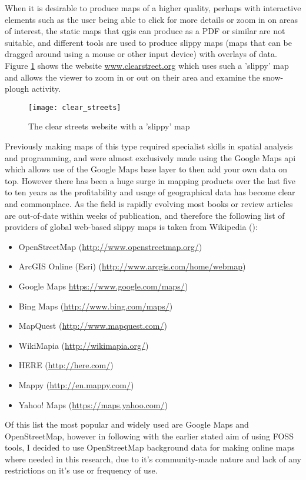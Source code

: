 When it is desirable to produce maps of a higher quality, perhaps with interactive elements such as the user being able to click for more details or zoom in on areas of interest, the static maps that \gls{qgis} can produce as a PDF or similar are not suitable, and different tools are used to produce slippy maps (maps that can be dragged around using a mouse or other input device) with overlays of data. Figure \ref{fig:clear_streets} shows the website \url{www.clearstreet.org} which uses such a 'slippy' map and allows the viewer to zoom in or out on their area and examine the snow-plough activity.

\begin{figure}[H]
\centering
\texttt{[image: clear\_streets]}
\caption{The clear streets website with a 'slippy' map}
\label{fig:clear_streets}
\end{figure}

Previously making maps of this type required specialist skills in spatial analysis and programming, and were almost exclusively made using the Google Maps \gls{api} which allows use of the Google Maps base layer to then add your own data on top. However there has been a huge surge in mapping products over the last five to ten years as the profitability and usage of geographical data has become clear and commonplace. As the field is rapidly evolving most books or review articles are out-of-date within weeks of publication, and therefore the following list of providers of global web-based slippy maps is taken from Wikipedia (\cite{wiki-maps-2014}):

\begin{itemize}
\item OpenStreetMap  (\url{http://www.openstreetmap.org/})
\item ArcGIS Online (Esri)  (\url{http://www.arcgis.com/home/webmap})
\item Google Maps \url{https://www.google.com/maps/})
\item Bing Maps (\url{http://www.bing.com/maps/})
\item MapQuest (\url{http://www.mapquest.com/})
\item WikiMapia (\url{http://wikimapia.org/})
\item HERE (\url{http://here.com/})
\item Mappy (\url{http://en.mappy.com/})
\item Yahoo! Maps (\url{https://maps.yahoo.com/})
\end{itemize}

Of this list the most popular and widely used are Google Maps and OpenStreetMap, however in following with the earlier stated aim of using FOSS tools, I decided to use OpenStreetMap background data for making online maps where needed in this research, due to it's community-made nature and lack of any restrictions on it's use or frequency of use.

